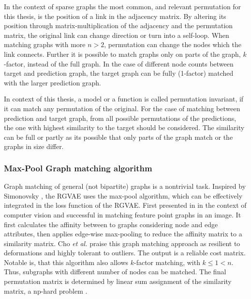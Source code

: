 {{In the context of sparse graphs the most common, and relevant permutation for this thesis, is the position of a link in the adjacency matrix. By altering its position through matrix-multiplication of the adjacency and the permutation matrix, the original link can change direction or turn into a self-loop. When matching graphs with more $n>2$, permutation can change the nodes which the link connects. Further it is possible to match graphs only on parts of the graph, $k$-factor, instead of the full graph. In the case of different node counts between target and prediction graph, the target graph can be fully (1-factor) matched with the larger prediction graph. 

In context of this thesis, a model or a function is called permutation invariant, if it can match any permutation of the original. For the case of matching between prediction and target graph, from all possible permutations of the predictions, the one with highest similarity to the target should be considered. The similarity can be full or partly as its possible that only parts of the graph match or the graphs in size differ.  



\subsubsection{Max-Pool Graph matching algorithm}


Graph matching of general (not bipartite) graphs is a nontrivial task. Inspired by Simonovsky \cite{simonovsky_graphvae_2018}, the RGVAE uses the max-pool algorithm, which can be effectively integrated in the loss function of the RGVAE. First presented in \cite{cho_finding_2014} in the context of computer vision and successful in matching feature point graphs in an image. It first calculates the affinity between to graphs considering node and edge attributes, then applies edge-wise max-pooling to reduce the affinity matrix to a similarity matrix. Cho \textit{et al.} praise this graph matching approach as resilient to deformations and highly tolerant to outliers. The output is a reliable cost matrix. Notable is, that this algorithm also allows $k$-factor matching, with $k \leq 1 < n$. Thus, subgraphs with different number of nodes can be matched. The final permutation matrix is determined by linear sum assignment of the similarity matrix, a np-hard problem \cite{diestel2016graph}.

}}
